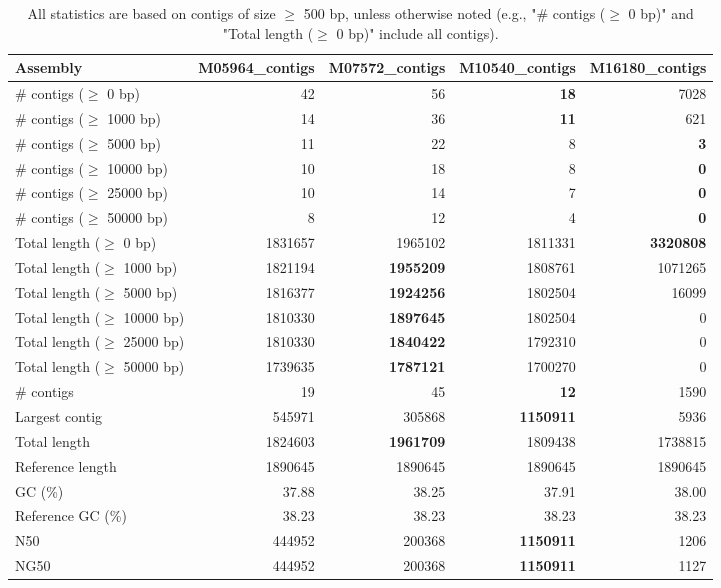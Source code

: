 \documentclass[12pt,a4paper]{article}
\begin{document}
\begin{table}[ht]
\begin{center}
\caption{All statistics are based on contigs of size $\geq$ 500 bp, unless otherwise noted (e.g., "\# contigs ($\geq$ 0 bp)" and "Total length ($\geq$ 0 bp)" include all contigs).}
\begin{tabular}{|l*{4}{|r}|}
\hline
Assembly & M05964\_contigs & M07572\_contigs & M10540\_contigs & M16180\_contigs \\ \hline
\# contigs ($\geq$ 0 bp) & 42 & 56 & {\bf 18} & 7028 \\ \hline
\# contigs ($\geq$ 1000 bp) & 14 & 36 & {\bf 11} & 621 \\ \hline
\# contigs ($\geq$ 5000 bp) & 11 & 22 & 8 & {\bf 3} \\ \hline
\# contigs ($\geq$ 10000 bp) & 10 & 18 & 8 & {\bf 0} \\ \hline
\# contigs ($\geq$ 25000 bp) & 10 & 14 & 7 & {\bf 0} \\ \hline
\# contigs ($\geq$ 50000 bp) & 8 & 12 & 4 & {\bf 0} \\ \hline
Total length ($\geq$ 0 bp) & 1831657 & 1965102 & 1811331 & {\bf 3320808} \\ \hline
Total length ($\geq$ 1000 bp) & 1821194 & {\bf 1955209} & 1808761 & 1071265 \\ \hline
Total length ($\geq$ 5000 bp) & 1816377 & {\bf 1924256} & 1802504 & 16099 \\ \hline
Total length ($\geq$ 10000 bp) & 1810330 & {\bf 1897645} & 1802504 & 0 \\ \hline
Total length ($\geq$ 25000 bp) & 1810330 & {\bf 1840422} & 1792310 & 0 \\ \hline
Total length ($\geq$ 50000 bp) & 1739635 & {\bf 1787121} & 1700270 & 0 \\ \hline
\# contigs & 19 & 45 & {\bf 12} & 1590 \\ \hline
Largest contig & 545971 & 305868 & {\bf 1150911} & 5936 \\ \hline
Total length & 1824603 & {\bf 1961709} & 1809438 & 1738815 \\ \hline
Reference length & 1890645 & 1890645 & 1890645 & 1890645 \\ \hline
GC (\%) & 37.88 & 38.25 & 37.91 & 38.00 \\ \hline
Reference GC (\%) & 38.23 & 38.23 & 38.23 & 38.23 \\ \hline
N50 & 444952 & 200368 & {\bf 1150911} & 1206 \\ \hline
NG50 & 444952 & 200368 & {\bf 1150911} & 1127 \\ \hline

\end{tabular}
\end{center}
\end{table}
\end{document}
